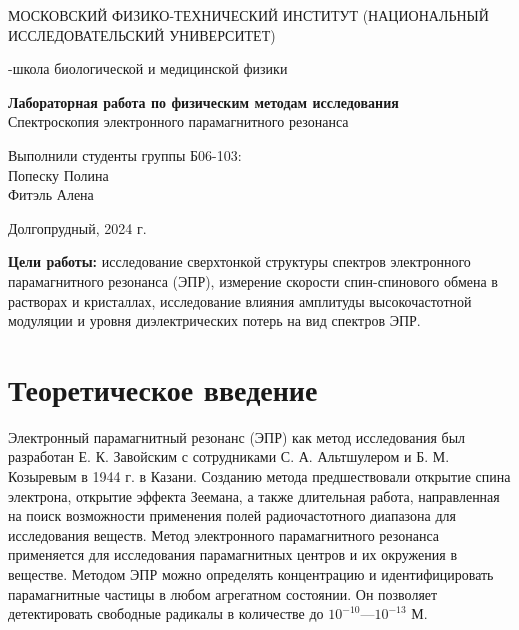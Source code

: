 \documentclass{article}
\begin{document}
\def\figurename{Рисунок}
\begin{titlepage}
\begin{center}
    {\large МОСКОВСКИЙ ФИЗИКО-ТЕХНИЧЕСКИЙ ИНСТИТУТ (НАЦИОНАЛЬНЫЙ ИССЛЕДОВАТЕЛЬСКИЙ УНИВЕРСИТЕТ)}
\end{center}
\begin{center}
    {-школа биологической и медицинской физики}
\end{center}

\vspace{1cm}
{\huge
\begin{center}
    {\bf Лабораторная работа по физическим методам исследования}\\
    \vspace{0.5cm}
    Спектроскопия электронного парамагнитного резонанса  
\end{center}
}

\vspace{4cm}
\begin{flushright}
{\LARGE Выполнили студенты группы Б06-103:\\Попеску Полина \\ Фитэль Алена}

\end{flushright}
\vspace{9cm}
\begin{center}
    Долгопрудный, 2024 г.
\end{center}
\end{titlepage}



\newpage

\setcounter{page}{2}

	\textbf{Цели работы:} исследование
сверхтонкой структуры спектров электронного парамагнитного резонанса (ЭПР), измерение скорости спин-спинового обмена в растворах и кристаллах, исследование влияния амплитуды
высокочастотной модуляции и уровня диэлектрических потерь на
вид спектров ЭПР.


\section{Теоретическое введение}
Электронный парамагнитный резонанс (ЭПР) как метод исследования
был разработан Е. К. Завойским с сотрудниками С. А. Альтшулером и
Б. М. Козыревым в 1944 г. в Казани. Созданию метода предшествовали
открытие спина электрона, открытие эффекта Зеемана, а также длительная
работа, направленная на поиск возможности применения полей
радиочастотного диапазона для исследования веществ.
Метод электронного парамагнитного резонанса применяется для
исследования парамагнитных центров и их окружения в веществе.
Методом ЭПР можно определять концентрацию и идентифицировать
парамагнитные частицы в любом агрегатном состоянии. Он позволяет
детектировать свободные радикалы в количестве до $10^{-10}$---$10^{-13}$ М.
\end{document}
